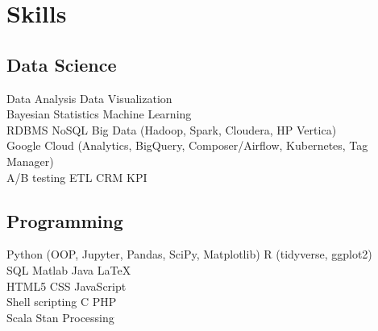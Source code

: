 \documentclass[]{deedy-resume-openfont}
\begin{document}
\begin{minipage}[t]{0.33\textwidth}

\section{Skills}
\subsection{Data Science}
Data Analysis \textbullet{} Data Visualization \\
Bayesian Statistics \textbullet{} Machine Learning \\
RDBMS \textbullet{} NoSQL \textbullet{}
Big Data (Hadoop, Spark, Cloudera, HP Vertica) \\
Google Cloud (Analytics, BigQuery, Composer/Airflow, Kubernetes, Tag Manager) \\
A/B testing \textbullet{} ETL \textbullet{} CRM \textbullet{} KPI \\
\sectionsep
\subsection{Programming}
Python (OOP, Jupyter, Pandas, SciPy, Matplotlib) \textbullet{}
R (tidyverse, ggplot2) \\
SQL \textbullet{} Matlab \textbullet{} Java \textbullet{} \LaTeX \\ 
HTML5 \textbullet{} CSS \textbullet{} JavaScript \\
Shell scripting \textbullet{} C \textbullet{} PHP \\
Scala \textbullet{} Stan \textbullet{} Processing
\sectionsep

%
%

\end{minipage} 
\hfill
\end{document}

